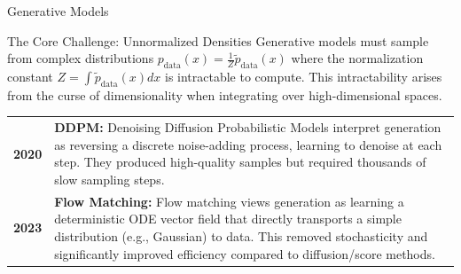 \documentclass[aspectratio=169,xcolor=dvipsnames]{beamer}
\begin{document}
\begin{frame}{Generative Models}
    \begin{center}
        \begin{minipage}{0.9\textwidth}

            \begin{block}{The Core Challenge: Unnormalized Densities}
                Generative models must sample from complex distributions $p_{\text{data}}(x) = \frac{1}{Z} \tilde{p}_{\text{data}}(x)$ where the normalization constant $Z = \int \tilde{p}_{\text{data}}(x) dx$ is intractable to compute. This intractability arises from the curse of dimensionality when integrating over high-dimensional spaces.
            \end{block}

            \vspace{0.3cm}

            \begin{tabular}{@{}l@{\hspace{0.8cm}}p{}@{}}
                \textbf{2020} & \textbf{DDPM:} Denoising Diffusion Probabilistic Models interpret generation as reversing a discrete noise-adding process, learning to denoise at each step. They produced high-quality samples but required thousands of slow sampling steps. \\[0.2cm]
                
                
                \textbf{2023} & \textbf{Flow Matching:} Flow matching views generation as learning a deterministic ODE vector field that directly transports a simple distribution (e.g., Gaussian) to data. This removed stochasticity and significantly improved efficiency compared to diffusion/score methods. \\[0.2cm]
            \end{tabular}
            
            \vspace{0.3cm}
        \end{minipage}
    \end{center}
\end{frame}
\end{document}
